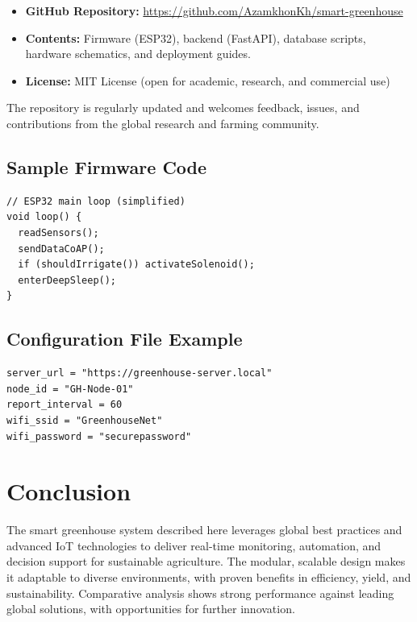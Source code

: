 \documentclass[12pt,a4paper]{article}
\begin{document}
\begin{itemize}
    \item \textbf{GitHub Repository:} \url{https://github.com/AzamkhonKh/smart-greenhouse}
    \item \textbf{Contents:} Firmware (ESP32), backend (FastAPI), database scripts, hardware schematics, and deployment guides.
    \item \textbf{License:} MIT License (open for academic, research, and commercial use)
\end{itemize}

The repository is regularly updated and welcomes feedback, issues, and contributions from the global research and farming community.

\subsection{Sample Firmware Code}
\begin{verbatim}
// ESP32 main loop (simplified)
void loop() {
  readSensors();
  sendDataCoAP();
  if (shouldIrrigate()) activateSolenoid();
  enterDeepSleep();
}
\end{verbatim}

\subsection{Configuration File Example}
\begin{verbatim}
server_url = "https://greenhouse-server.local"
node_id = "GH-Node-01"
report_interval = 60
wifi_ssid = "GreenhouseNet"
wifi_password = "securepassword"
\end{verbatim}

\section{Conclusion}
The smart greenhouse system described here leverages global best practices and advanced IoT technologies to deliver real-time monitoring, automation, and decision support for sustainable agriculture. The modular, scalable design makes it adaptable to diverse environments, with proven benefits in efficiency, yield, and sustainability. Comparative analysis shows strong performance against leading global solutions, with opportunities for further innovation.

\newpage
\end{document}
